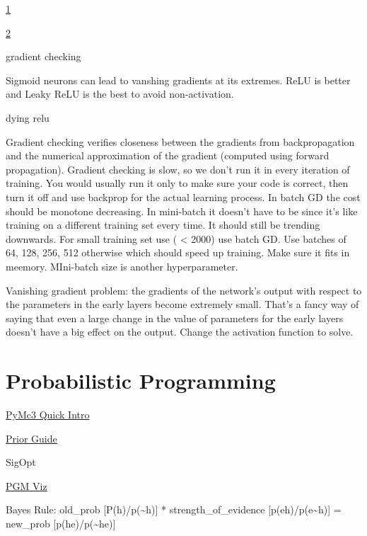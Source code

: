 \documentclass[]{book}
\begin{document}
\href{http://theorangeduck.com/page/neural-network-not-working}{1}

\href{https://towardsdatascience.com/checklist-for-debugging-neural-networks-d8b2a9434f21}{2}

gradient checking

Sigmoid neurons can lead to vanshing gradients at its extremes. ReLU is
better and Leaky ReLU is the best to avoid non-activation.

dying relu

Gradient checking verifies closeness between the gradients from
backpropagation and the numerical approximation of the gradient
(computed using forward propagation). Gradient checking is slow, so we
don't run it in every iteration of training. You would usually run it
only to make sure your code is correct, then turn it off and use
backprop for the actual learning process. In batch GD the cost should be
monotone decreasing. In mini-batch it doesn't have to be since it's like
training on a different training set every time. It should still be
trending downwards. For small training set use ( \textless{} 2000) use
batch GD. Use batches of 64, 128, 256, 512 otherwise which should speed
up training. Make sure it fits in meemory. MIni-batch size is another
hyperparameter.

Vanishing gradient problem: the gradients of the network's output with
respect to the parameters in the early layers become extremely small.
That's a fancy way of saying that even a large change in the value of
parameters for the early layers doesn't have a big effect on the output.
Change the activation function to solve.

\chapter{Probabilistic Programming}\label{probabilistic-programming}

\href{https://docs.google.com/presentation/d/1buknIrG5b8u0twrwvlxcTudIOdx68AlqDiST_A_jJ9g/edit\#slide=id.g4254d546f6_0_0}{PyMc3
Quick Intro}

\href{https://github.com/stan-dev/stan/wiki/Prior-Choice-Recommendations}{Prior
Guide}

SigOpt

\href{http://daft-pgm.org}{PGM Viz}

Bayes Rule: old\_prob {[}P(h)/p(\textasciitilde{}h){]} *
strength\_of\_evidence
{[}p(e\textbar{}h)/p(e\textbar{}\textasciitilde{}h){]} = new\_prob
{[}p(h\textbar{}e)/p(\textasciitilde{}h\textbar{}e){]}
\end{document}
